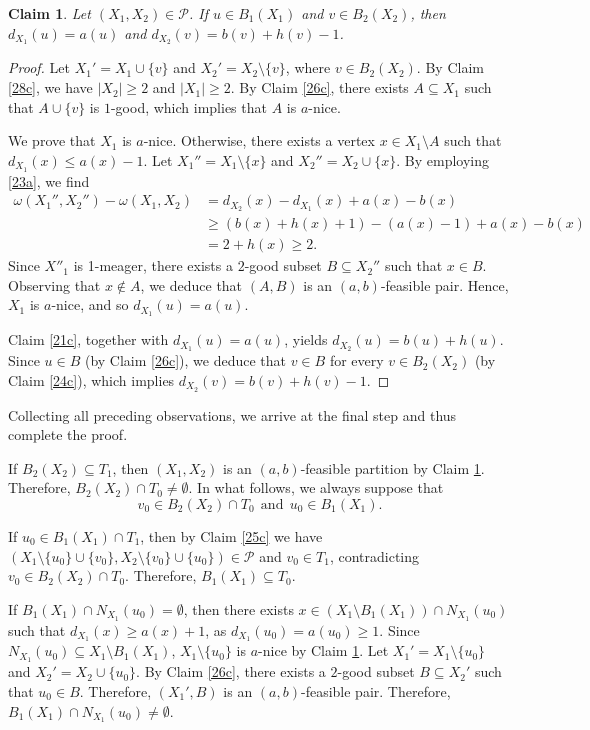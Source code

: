 \documentclass[11p]{elsarticle}
\newtheorem{claim}[theorem]{Claim}
\theoremstyle{definition}
\begin{document}
\begin{claim}\label{29c}
	Let $ (X_1,X_2)\in\mathcal{P} $. If $u\in B_1(X_1)$ and $v\in B_2(X_2)$, then  $ d_{X_1}(u)=a(u) $ and $ d_{X_2}(v)=b(v)+h(v)-1 $.
\end{claim}
\begin{proof}
 Let $ X_1'=X_1\cup\{v\} $ and $ X_2'=X_2\setminus\{v\} $, where $v\in B_2(X_2)$.   By Claim \ref{28c}, we have  $|X_2|\ge 2$ and $|X_1|\ge 2$. By Claim \ref{26c},  there exists $ A\subseteq X_1 $ such that $ A\cup\{v\} $ is $ 1 $-good,  which implies that $ A $ is $a$-nice.

  We prove that $X_1$ is $a$-nice. Otherwise, there exists a vertex $ x\in X_1\setminus A $ such that $ d_{X_1}(x)\le a(x)-1 $. Let $ X_1''=X_1\setminus\{x\}  $ and $ X_2''=X_2\cup\{x\} $. By employing \eqref{23a}, we find   \begin{align*}
		\omega(X_1'',X_2'')-\omega(X_1,X_2)&=d_{X_2}(x)-d_{X_1}(x)+a(x)-b(x)\nonumber\\&\ge (b(x)+h(x)+1)-(a(x)-1)+a(x)-b(x)\\&=2+h(x) \ge2.
	\end{align*}  Since $X''_1$ is 1-meager, there exists a $ 2 $-good subset $ B\subseteq X_2'' $ such that $ x\in B $. Observing that $ x\notin A $, we deduce that $ (A,B) $ is an $ (a,b) $-feasible pair. Hence, $X_1$ is   $a$-nice, and so $ d_{X_1}(u)=a(u)$.

 Claim \ref{21c}, together with $ d_{X_1}(u)=a(u)$, yields $d_{X_2}(u)=b(u)+h(u)$. Since  $u\in B$ (by Claim \ref{26c}), we deduce that $v\in B$ for every $v\in B_2(X_2)$ (by Claim \ref{24c}), which implies  $ d_{X_2}(v)=b(v)+h(v)-1 $. \end{proof}

Collecting all preceding observations, we arrive at the final step and thus complete the proof.



\medskip{} If $B_2(X_2)\subseteq T_1$, then $ (X_1,X_2) $ is an $ (a,b) $-feasible partition by Claim \ref{29c}. Therefore,  $B_2(X_2)\cap T_0\ne \emptyset$. In what follows, we always suppose that $$v_0\in B_2(X_2)\cap T_0~~\text{and}~~u_0\in B_1(X_1).$$

If  $u_0\in B_1(X_1)\cap T_1$, then by Claim \ref{25c} we have  $(X_1\setminus \{u_0\}\cup \{v_0\}, X_2\setminus \{v_0\}\cup \{u_0\})\in  \mathcal{P}$ and $v_0\in T_1$, contradicting $v_0\in B_2(X_2)\cap T_0$.   Therefore,  $B_1(X_1)\subseteq T_0$.

If $B_1(X_1)\cap N_{X_1}(u_0)=\emptyset$, then there exists  $ x\in (X_1\setminus B_1(X_1))\cap N_{X_1}(u_0)$ such that   $ d_{X_1}(x)\ge a(x)+1 $, as $d_{X_1}(u_0)=a(u_0)\ge 1$. Since $ N_{X_1}(u_0)\subseteq X_1\setminus B_1(X_1)$,  $ X_1\setminus\{u_0\} $ is $ a $-nice by Claim \ref{29c}. Let $ X_1'=X_1\setminus \{u_0\} $ and $ X_2'=X_2\cup \{u_0\} $. By Claim \ref{26c}, there exists a $ 2 $-good subset $ B\subseteq X_2' $ such that $ u_0\in B $. Therefore, $ (X_1',B) $ is an $ (a,b) $-feasible pair. Therefore, $B_1(X_1)\cap N_{X_1}(u_0)\ne \emptyset$.
\end{document}
